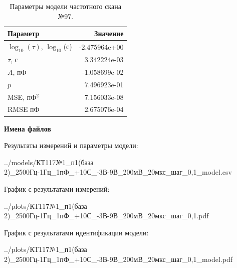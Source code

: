 \begin{table}[!ht]
    \centering
    \caption{Параметры модели частотного скана №97.}
    \begin{tabular}{|l|r|}
        \hline
        Параметр                                       & Значение                  \\ \hline
        $\log_{10}(\tau)$, $\log_{10}$(с)              & -2.475964e+00             \\ \hline
        $\tau$, с                                      & 3.342224e-03              \\ \hline
        $A$, пФ                                        & -1.058699e-02             \\ \hline
        $p$                                            & 7.496923e-01              \\ \hline
        MSE, пФ$^2$                                    & 7.156033e-08              \\ \hline
        RMSE пФ                                        & 2.675076e-04              \\ \hline
    \end{tabular}
    \label{table:frequency_scan_model_97}
\end{table}

\textbf{Имена файлов}

Результаты измерений и параметры модели:

\scriptsize../models/КТ117№1\_п1(база 2)\_2500Гц-1Гц\_1пФ\_+10С\_-3В-9В\_200мВ\_20мкс\_шаг\_0,1\_model.csv
\normalsize

График с результатами измерений:

\scriptsize../plots/КТ117№1\_п1(база 2)\_2500Гц-1Гц\_1пФ\_+10С\_-3В-9В\_200мВ\_20мкс\_шаг\_0,1.pdf
\normalsize

График с результатами идентификации модели:

\scriptsize../plots/КТ117№1\_п1(база 2)\_2500Гц-1Гц\_1пФ\_+10С\_-3В-9В\_200мВ\_20мкс\_шаг\_0,1\_model.pdf
\normalsize

